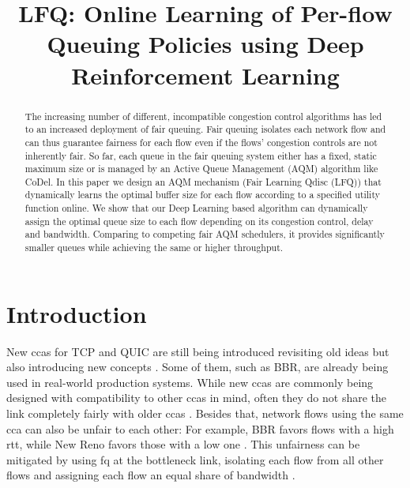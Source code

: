 \documentclass[conference]{IEEEtran}
\begin{document}
\title{LFQ: Online Learning of Per-flow Queuing Policies using Deep Reinforcement Learning}

\author{
}

\maketitle

\begin{abstract}
The increasing number of different, incompatible congestion control algorithms has led to an increased deployment of fair queuing. Fair queuing isolates each network flow and can thus guarantee fairness for each flow even if the flows' congestion controls are not inherently fair. So far, each queue in the fair queuing system either has a fixed, static maximum size or is managed by an Active Queue Management (AQM) algorithm like CoDel. In this paper we design an AQM mechanism (Fair Learning Qdisc (LFQ)) that dynamically learns the optimal buffer size for each flow according to a specified utility function online. We show that our Deep Learning based algorithm can dynamically assign the optimal queue size to each flow depending on its congestion control, delay and bandwidth. Comparing to competing fair AQM schedulers, it provides significantly smaller queues while achieving the same or higher throughput. 
\end{abstract}

\section{Introduction}
\label{sec:intro}

New \glspl{cca} for TCP and QUIC are still being introduced revisiting old ideas but also introducing new concepts \cite{dong_pcc_2018, cardwell_bbr:_2016, hock_tcp_2017, bachl_cocoa_2019, jay_deep_2019}. Some of them, such as BBR, are already being used in real-world production systems. While new \glspl{cca} are commonly being designed with compatibility to other \glspl{cca} in mind, often they do not share the link completely fairly with older \glspl{cca} \cite{hock_experimental_2017, fejes_who_2019, fejes_incompatibility_2020}. Besides that, network flows using the same \gls{cca} can also be unfair to each other: For example, BBR favors flows with a high \gls{rtt}, while New Reno favors those with a low one \cite{turkovic_interactions_2019,turkovic_fifty_2019}. This unfairness can be mitigated by using \gls{fq} at the bottleneck link, isolating each flow from all other flows and assigning each flow an equal share of bandwidth \cite{dumazet_pkt_sched:_2013}. 
\end{document}

